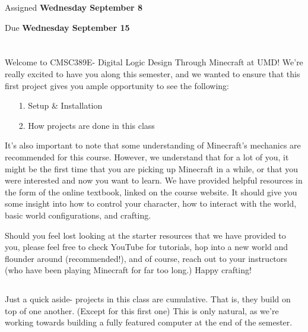 \documentclass{article}
\begin{document}
\large

{\selectfont{\Huge CMSC389E Project 0: \par Tutorial Island (Or Desert)}}

Assigned \textbf{Wednesday September 8}

Due \textbf{Wednesday September 15}

\section{\selectfont{Welcome!}}

Welcome to CMSC389E- Digital Logic Design Through Minecraft at UMD! We're really excited to have you along this semester, and we wanted to ensure that this first project gives you ample opportunity to see the following:

\begin{itemize}
  \item[1.] Setup \& Installation
  \item[2. ] How projects are done in this class
\end{itemize}

It's also important to note that some understanding of Minecraft's mechanics are recommended for this course. However, we understand that for a lot of you, it might be the first time that you are picking up Minecraft in a while, or that you were interested and now you want to learn. We have provided helpful resources in the form of the online textbook, linked on the course website. It should give you some insight into how to control your character, how to interact with the world, basic world configurations, and crafting.

Should you feel lost looking at the starter resources that we have provided to you, please feel free to check YouTube for tutorials, hop into a new world and flounder around (recommended!), and of course, reach out to your instructors (who have been playing Minecraft for far too long.) Happy crafting!

\subsection{\selectfont{Projects are Cumulative}}

Just a quick aside- projects in this class are cumulative. That is, they build on top of one another. (Except for this first one) This is only natural, as we're working towards building a fully featured computer at the end of the semester. 
\end{document}
